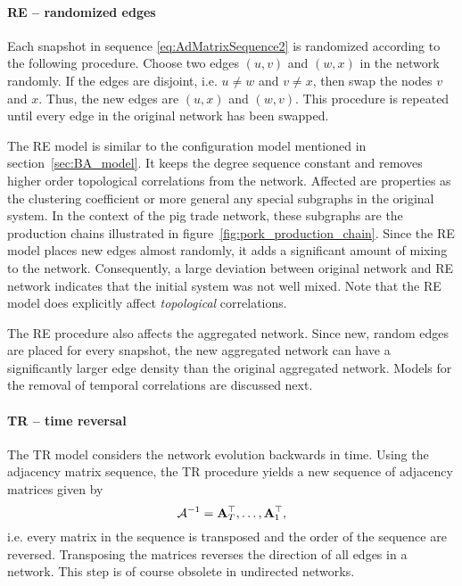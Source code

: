 \paragraph{RE -- randomized edges\color{Cayenne}{.}}
Each snapshot in sequence \eqref{eq:AdMatrixSequence2} is randomized according to the following procedure.
Choose two edges $(u,v)$ and $(w,x)$ in the network randomly.
If the edges are disjoint, i.e. $u\neq w$ and $v\neq x$, then swap the nodes $v$ and $x$.
Thus, the new edges are $(u,x)$ and $(w,v)$.
This procedure is repeated until every edge in the original network has been swapped.

The RE model is similar to the configuration model mentioned in section~\ref{sec:BA_model}.
It keeps the degree sequence constant and removes higher order topological correlations from the network.
Affected are properties as the clustering coefficient or more general any special subgraphs in the original system.
In the context of the pig trade network, these subgraphs are the production chains illustrated in figure~\ref{fig:pork_production_chain}.
Since the RE model places new edges almost randomly, it adds a significant amount of mixing to the network.
Consequently, a large deviation between original network and RE network indicates that the initial system was not well mixed.
Note that the RE model does explicitly affect \emph{topological} correlations.

The RE procedure also affects the aggregated network.
Since new, random edges are placed for every snapshot, the new aggregated network can have a significantly larger edge density than the original aggregated network.
Models for the removal of temporal correlations are discussed next.

\paragraph{TR -- time reversal\color{Cayenne}{.}}
The TR model considers the network evolution backwards in time.
Using the adjacency matrix sequence, the TR procedure yields a new sequence of adjacency matrices given by
\begin{equation}\label{eq:TR_secuence}
\mathcal{A}^{-1}=\mathbf{A}^\top _T, \dots ,\mathbf{A}_1 ^\top,
\end{equation}
i.e. every matrix in the sequence is transposed and the order of the sequence are reversed.
Transposing the matrices reverses the direction of all edges in a network.
This step is of course obsolete in undirected networks.

